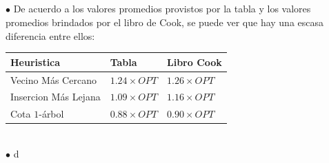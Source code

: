 \documentclass[10pt,a4paper]{report}
\begin{document}
\ \\\\\\\\
$\bullet$ De acuerdo a los valores promedios provistos por la tabla y los valores promedios brindados por el libro de Cook, se puede ver que hay una escasa diferencia entre ellos:
\begin{table}[htbp]
\begin{center}
\begin{tabular}{|l|l|l|}
\hline
Heuristica & Tabla & Libro Cook\\
\hline
Vecino M\'as Cercano & $1.24\times OPT$ & $1.26\times OPT$\\
Insercion M\'as Lejana & $1.09\times OPT$ & $1.16\times OPT$\\
Cota $1$-\'arbol & $0.88\times OPT$ & $0.90 \times OPT$\\ 
\hline
\end{tabular}
\end{center}
\end{table}
\\
$\bullet$ d
\end{document}
